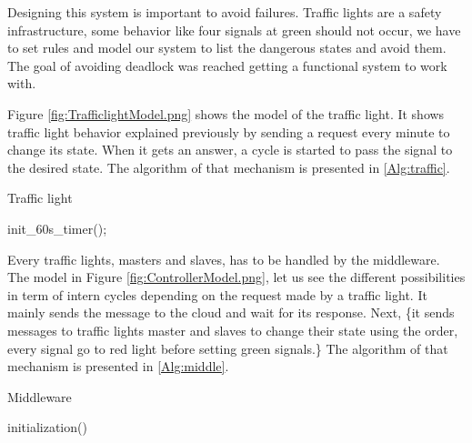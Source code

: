 Designing this system is important to avoid failures.
Traffic lights are a safety infrastructure,
	some behavior like four signals at green should not occur,
	we have to set rules and model our system to list the dangerous states and avoid them.
The goal of avoiding deadlock was reached getting a functional system to work with.

Figure \ref{fig:TrafficlightModel.png} shows the model of the traffic light.
It shows traffic light behavior explained previously by sending a request every minute to change its state.
When it gets an answer,
	a cycle is started to pass the signal to the desired state.
The algorithm of that mechanism is presented in \ref{Alg:traffic}.

\LinesNumbered \begin{algorithm}[ht] \caption{Traffic light\label{Alg:traffic}}
init\_60s\_timer();
\end{algorithm}

Every traffic lights,
	masters and slaves,
	has to be handled by the middleware.
The model in Figure \ref{fig:ControllerModel.png},
	let us see the different possibilities in term of intern cycles depending on the request made by a traffic light.
It mainly sends the message to the cloud and wait for its response.
Next,
	\{it sends messages to traffic lights master and slaves to change their state using the order,
	every signal go to red light before setting green signals.\}
The algorithm of that mechanism is presented in \ref{Alg:middle}.

\LinesNumbered \begin{algorithm}[ht] \caption{Middleware\label{Alg:middle}}
initialization()\;
\end{algorithm}

